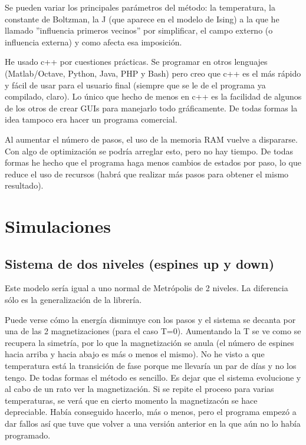 \documentclass[a4paper,10pt,twocolumn]{article}
\begin{document}
Se pueden variar los principales par\'ametros del m\'etodo: la temperatura, la constante de Boltzman, la J (que aparece en el modelo de Ising) a la que he llamado ''influencia primeros vecinos'' por simplificar, el campo externo (o influencia externa) y como afecta esa imposici\'on.

He usado c++ por cuestiones pr\'acticas. Se programar en otros lenguajes (Matlab/Octave, Python, Java, PHP y Bash) pero creo que c++ es el m\'as r\'apido y f\'acil de usar para el usuario final (siempre que se le de el programa ya compilado, claro). Lo \'unico que hecho de menos en c++ es la facilidad de algunos de los otros de crear GUIs para manejarlo todo gr\'aficamente. De todas formas la idea tampoco era hacer un programa comercial. 

Al aumentar el n\'umero de pasos, el uso de la memoria RAM vuelve a dispararse. Con algo de optimizaci\'on se podr\'ia arreglar esto, pero no hay tiempo. De todas formas he hecho que el programa haga menos cambios de estados por paso, lo que reduce el uso de recursos (habr\'a que realizar m\'as pasos para obtener el mismo resultado).

\section*{Simulaciones}
\subsection*{Sistema de dos niveles (espines up y down)}

Este modelo ser\'ia igual a uno normal de Metr\'opolis de 2 niveles. La diferencia s\'olo es la generalizaci\'on de la librer\'ia.


Puede verse c\'omo la energ\'ia disminuye con los pasos y el sistema se decanta por una de las 2 magnetizaciones (para el caso T=0). Aumentando la T se ve como se recupera la simetr\'ia, por lo que la magnetizaci\'on se anula (el n\'umero de espines hacia arriba y hacia abajo es m\'as o menos el mismo). No he visto a que temperatura est\'a la transici\'on de fase porque me llevar\'ia un par de d\'ias y no los tengo. De todas formas el m\'etodo es sencillo. Es dejar que el sistema evolucione y al cabo de un rato ver la magnetizaci\'on. Si se repite el proceso para varias temperaturas, se ver\'a que en cierto momento la magnetizac\'on se hace depreciable. Hab\'ia conseguido hacerlo, m\'as o menos, pero el programa empez\'o a dar fallos as\'i que tuve que volver a una versi\'on anterior en la que a\'un no lo hab\'ia programado.
\end{document}
